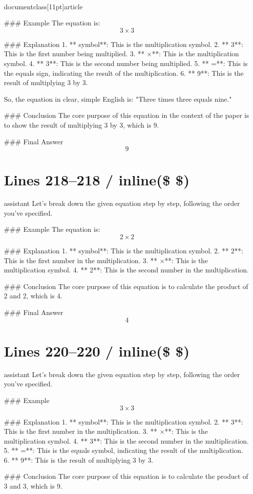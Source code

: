 \\documentclass[11pt]{article}
\begin{document}
### Example
The equation is:
\[ 3 \times 3 \]

### Explanation
1. ** symbol**: This is the multiplication symbol.
2. ** 3**: This is the first number being multiplied.
3. ** ×**: This is the multiplication symbol.
4. ** 3**: This is the second number being multiplied.
5. ** =**: This is the equals sign, indicating the result of the multiplication.
6. ** 9**: This is the result of multiplying 3 by 3.

So, the equation in clear, simple English is:
"Three times three equals nine."

### Conclusion
The core purpose of this equation in the context of the paper is to show the result of multiplying 3 by 3, which is 9.

### Final Answer
\[
\boxed{9}
\]


\section*{Lines 218–218 / inline(\$ \$) }
assistant
Let's break down the given equation step by step, following the order you've specified.

### Example
The equation is:
\[ 2 \times 2 \]

### Explanation
1. ** symbol**: This is the multiplication symbol.
2. ** 2**: This is the first number in the multiplication.
3. ** ×**: This is the multiplication symbol.
4. ** 2**: This is the second number in the multiplication.

### Conclusion
The core purpose of this equation is to calculate the product of 2 and 2, which is 4.

### Final Answer
\[
\boxed{4}
\]


\section*{Lines 220–220 / inline(\$ \$) }
assistant
Let's break down the given equation step by step, following the order you've specified.

### Example
\[ 3 \times 3 \]

### Explanation
1. ** symbol**: This is the multiplication symbol.
2. ** 3**: This is the first number in the multiplication.
3. ** ×**: This is the multiplication symbol.
4. ** 3**: This is the second number in the multiplication.
5. ** =**: This is the equals symbol, indicating the result of the multiplication.
6. ** 9**: This is the result of multiplying 3 by 3.

### Conclusion
The core purpose of this equation is to calculate the product of 3 and 3, which is 9.
\end{document}
